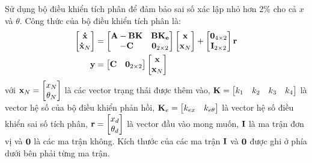 \documentclass[12pt,a4paper]{article}
\begin{document}
Sử dụng bộ điều khiển tích phân để đảm bảo sai số xác lập nhỏ hơn 2\% cho cả $x$ và $\theta$. Công thức của bộ điều khiển tích phân là:
\begin{align}
    \begin{bmatrix}
        \vb{\dot x} \\
        \vb{\dot x}_N
    \end{bmatrix} & = \begin{bmatrix}
        \vb{A - BK} & \vb{BK_e}\\
        \vb{-C} & \vb{0}_{2\times 2}
    \end{bmatrix}\begin{bmatrix}
        \vb{x} \\
        \vb{x}_N
    \end{bmatrix} + \begin{bmatrix}
        \vb{0}_{4\times 2} \\
        \vb{I}_{2\times 2}
    \end{bmatrix} \vb r\\
    \vb y & = \begin{bmatrix}
        \vb C & \vb 0_{2\times 2} 
    \end{bmatrix} \begin{bmatrix}
        \vb{x} \\
        \vb{x}_N
    \end{bmatrix}
\end{align}
với $\vb x_N = \begin{bmatrix}
    x_N \\ \theta_N 
\end{bmatrix}$ là các vector trạng thái được thêm vào, $\vb K = \begin{bmatrix}
    k_1 & k_2 & k_3 & k_4
\end{bmatrix}$ là vector hệ số của bộ điều khiển phản hồi, $\vb K_e = \begin{bmatrix}
    k_{ex} & k_{e\theta}
\end{bmatrix}$ là vector hệ số điều khiển sai số tích phân, $\vb r = \begin{bmatrix}
    x_d \\
    \theta_d
\end{bmatrix}$ là vector đầu vào mong muốn, $\vb I$ là ma trận đơn vị và $\vb 0$ là các ma trận không. Kích thước của các ma trận $\vb I$ và $\vb 0$ được ghi ở phía dưới bên phải từng ma trận.
\end{document}

